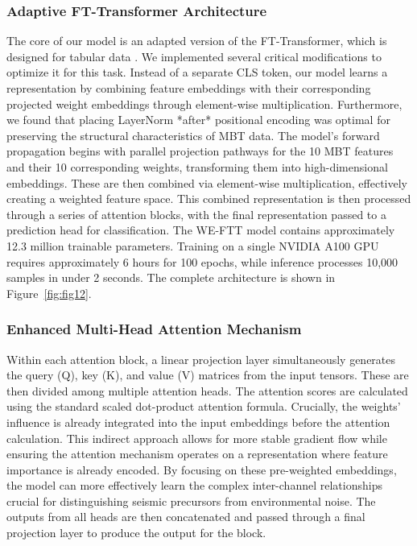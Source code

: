 \documentclass[preprint,review,12pt,authoryear]{elsarticle}
\begin{document}
\subsubsection{Adaptive FT-Transformer Architecture}\label{sec:adaptive_architecture}
The core of our model is an adapted version of the FT-Transformer, which is designed for tabular data \citep{gorishniyRevisitingDeepLearning2021,vaswaniAttentionAllYou2017}. We implemented several critical modifications to optimize it for this task. Instead of a separate CLS token, our model learns a representation by combining feature embeddings with their corresponding projected weight embeddings through element-wise multiplication. Furthermore, we found that placing LayerNorm *after* positional encoding was optimal for preserving the structural characteristics of MBT data. The model's forward propagation begins with parallel projection pathways for the 10 MBT features and their 10 corresponding weights, transforming them into high-dimensional embeddings. These are then combined via element-wise multiplication, effectively creating a weighted feature space. This combined representation is then processed through a series of attention blocks, with the final representation passed to a prediction head for classification. The WE-FTT model contains approximately 12.3 million trainable parameters. Training on a single NVIDIA A100 GPU requires approximately 6 hours for 100 epochs, while inference processes 10,000 samples in under 2 seconds. The complete architecture is shown in Figure~\ref{fig:fig12}.

\subsubsection{Enhanced Multi-Head Attention Mechanism}\label{sec:attention_mechanism}
Within each attention block, a linear projection layer simultaneously generates the query (Q), key (K), and value (V) matrices from the input tensors. These are then divided among multiple attention heads. The attention scores are calculated using the standard scaled dot-product attention formula. Crucially, the weights' influence is already integrated into the input embeddings before the attention calculation. This indirect approach allows for more stable gradient flow while ensuring the attention mechanism operates on a representation where feature importance is already encoded. By focusing on these pre-weighted embeddings, the model can more effectively learn the complex inter-channel relationships crucial for distinguishing seismic precursors from environmental noise. The outputs from all heads are then concatenated and passed through a final projection layer to produce the output for the block.
\end{document}
